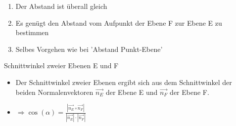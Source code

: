 \documentclass[paper=a6,ngerman,twoside=true,fontsize=14pt, parskip = half]{scrartcl}
\begin{document}
\begin{antwort} 
	\begin{enumerate} 
		\item Der Abstand ist überall gleich
		\item Es genügt den Abstand vom Aufpunkt der Ebene F zur Ebene E zu bestimmen
		\item Selbes Vorgehen wie bei 'Abstand Punkt-Ebene'	
	\end{enumerate} 
	
\end{antwort}
\begin{frage}
	Schnittwinkel zweier Ebenen E und F	
	
\end{frage}
\begin{antwort}
	
	\begin{itemize} 
		\item Der Schnittwinkel zweier Ebenen ergibt sich aus dem Schnittwinkel der beiden Normalenvektoren $\vec{n_E}$ der Ebene E und $\vec{n_F}$ der Ebene F.  
		\item $\Rightarrow \cos(\alpha)=\frac{|\vec{n_E} \circ \vec{n_F}|}{|\vec{n_E}|\cdot|\vec{n_F}|}$
	\end{itemize} 	
\end{antwort}
\end{document}

